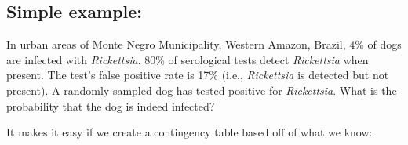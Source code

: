 \documentclass[12pt]{article}
\begin{document}
\subsection*{Simple example:}
In urban areas of Monte Negro Municipality, Western Amazon, Brazil, 4\% of dogs are infected with \emph{Rickettsia}. 80\% of serological tests detect \emph{Rickettsia} when present. The test's false positive rate is 17\% (i.e., \emph{Rickettsia} is detected but not present). A randomly sampled dog has tested positive for \emph{Rickettsia}. What is the probability that the dog is indeed infected?

It makes it easy if we create a contingency table based off of what we know:
\end{document}
